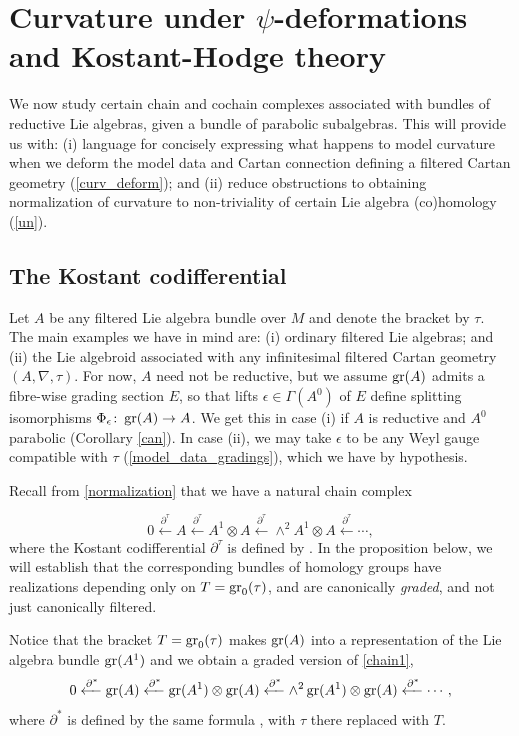 \documentclass[leqno,12pt]{amsart} %
\newcommand\refreshpage{\newpage}
\newcommand\refreshpage{}
\newcommand{\leftpartial}[1]{\xleftarrow{\partial^{#1}}}
\begin{document}
\refreshpage
\section{Curvature under $\psi$-deformations and Kostant-Hodge theory}
We now study certain chain and cochain complexes associated with bundles of reductive Lie
algebras, given a bundle of parabolic subalgebras. This will provide us with: (i) language
for concisely expressing what happens to model curvature when we deform the model data and
Cartan connection defining a filtered Cartan geometry (\ref{curv_deform}); and (ii) reduce
obstructions to obtaining normalization of curvature to non-triviality of certain Lie
algebra (co)homology (\ref{un}).

\subsection{The Kostant codifferential}\label{homology}
Let $A$ be any filtered Lie algebra bundle over $M$ and denote the bracket by $\tau $. The
main examples we have in mind are: (i) ordinary filtered Lie algebras; and (ii) the Lie
algebroid associated with any infinitesimal filtered Cartan geometry $(A, \nabla,
\tau)$. For now, $A$ need not be reductive, but we assume $\operatorname{\operatorname{gr}}(A)$ admits a fibre-wise
grading section $E$, so that lifts $\epsilon \in \Gamma(A^0)$ of $E$ define splitting
isomorphisms $\Phi_\epsilon \colon \operatorname{\operatorname{gr}}(A) \rightarrow A$. We get this in case (i) if
$A$ is reductive and $A^0$ parabolic (Corollary \ref{can}). In case (ii), we may take
$\epsilon $ to be any Weyl gauge compatible with $\tau $ (\ref{model_data_gradings}),
which we have by hypothesis.

Recall from \ref{normalization} that we have a natural chain complex

\begin{equation}
  \label{chain1} 0 \leftpartial{\tau} A \leftpartial{\tau} A^1 \otimes A
\leftpartial{\tau} \wedge^2 A^1 \otimes A \leftpartial{\tau} \cdots,
\end{equation}
where the Kostant codifferential $\partial^\tau$ is defined by
. In the proposition below, we will establish that the
corresponding bundles of homology groups have realizations depending only on
$T = \operatorname{\operatorname{gr}}_0(\tau)$, and are canonically {\em graded}, and not just canonically
filtered.

Notice that the bracket $T = \operatorname{\operatorname{gr}}_0(\tau)$ makes $\operatorname{\operatorname{gr}}(A)$ into a representation of
the Lie algebra bundle $\operatorname{\operatorname{gr}}(A^1)$ and we obtain a graded version of \eqref{chain1},
\begin{equation}
  \label{chain2} 0 \leftpartial{*}  \graded(A)
  \leftpartial{*} \graded(A^1) \otimes \graded(A)
  \leftpartial{*} \wedge^2 \graded(A^1) \otimes \graded(A) \leftpartial{*} \cdots,
\end{equation}
where $\partial^*$ is defined by the same formula , with $\tau $ there
replaced with $T$.
\end{document}
